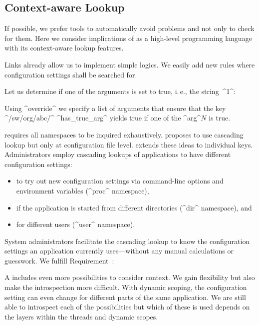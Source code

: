 \subsection{Context-aware Lookup}

If possible, we prefer tools to automatically avoid problems and not only to check for them.
Here we consider implications of  as a high-level programming language with its context-aware lookup features.

Links already allow us to implement simple logics.
We easily add new rules where configuration settings shall be searched for.
\begin{example}

\label{ex:override-argument}
Let us determine if one of the arguments is set to true, i.\,e., the string~^1^:


Using ^override^ we specify a list of arguments that ensure that the key ^/sw/org/abc/^ ^has_true_arg^ yields true if one of the ^arg^$N$ is true.
\end{example}

 requires all namespaces to be inquired exhaustively.
\citet{evard1997analysis} proposes to use cascading lookup but only at configuration file level.
\elektra{} extends these ideas to individual keys.
Administrators employ cascading lookups of applications to have different configuration settings:
\begin{itemize}
 \item to try out new configuration settings via command-line options and environment variables (^proc^ namespace),
 \item if the application is started from different directories (^dir^ namespace), and
 \item for different users (^user^ namespace).
\end{itemize}

System administrators facilitate the cascading lookup to know the configuration settings an application currently uses---without any manual calculations or guesswork.
We fulfill Requirement~:
\reqIntrospection*

A  includes even more possibilities to consider context.
We gain flexibility but also make the introspection more difficult.
With dynamic scoping, the configuration setting can even change for different parts of the same application.
We are still able to introspect each of the possibilities but which of these is used depends on the layers within the threads and dynamic scopes.

